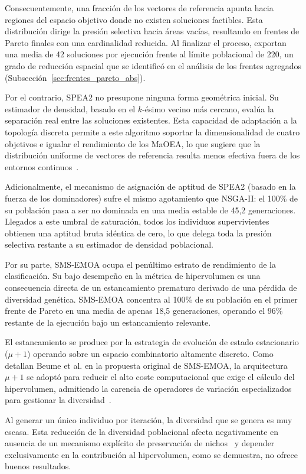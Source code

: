 Consecuentemente, una fracción de los vectores de referencia apunta hacia regiones del espacio objetivo donde no existen soluciones factibles. Esta distribución dirige la presión selectiva hacia áreas vacías, resultando en frentes de Pareto finales con una cardinalidad reducida. Al finalizar el proceso, exportan una media de 42 soluciones por ejecución frente al límite poblacional de 220, un grado de reducción espacial que se identificó en el análisis de los frentes agregados (Subsección~\ref{sec:frentes_pareto_abs}).

Por el contrario, SPEA2 no presupone ninguna forma geométrica inicial. Su estimador de densidad, basado en el $k$-ésimo vecino más cercano, evalúa la separación real entre las soluciones existentes. Esta capacidad de adaptación a la topología discreta permite a este algoritmo soportar la dimensionalidad de cuatro objetivos e igualar el rendimiento de los MaOEA, lo que sugiere que la distribución uniforme de vectores de referencia resulta menos efectiva fuera de los entornos continuos~\cite{ishibuchi2015behavior}.

Adicionalmente, el mecanismo de asignación de aptitud de SPEA2 (basado en la fuerza de los dominadores) sufre el mismo agotamiento que NSGA-II: el 100\% de su población pasa a ser no dominada en una media estable de 45,2 generaciones. Llegados a este umbral de saturación, todos los individuos supervivientes obtienen una aptitud bruta idéntica de cero, lo que delega toda la presión selectiva restante a su estimador de densidad poblacional.

Por su parte, SMS-EMOA ocupa el penúltimo estrato de rendimiento de la clasificación. Su bajo desempeño en la métrica de hipervolumen es una consecuencia directa de un estancamiento prematuro derivado de una pérdida de diversidad genética. SMS-EMOA concentra al 100\% de su población en el primer frente de Pareto en una media de apenas 18,5 generaciones, operando el 96\% restante de la ejecución bajo un estancamiento relevante.

El estancamiento se produce por la estrategia de evolución de estado estacionario ($\mu+1$) operando sobre un espacio combinatorio altamente discreto. Como detallan Beume et al. en la propuesta original de SMS-EMOA, la arquitectura $\mu+1$ se adoptó para reducir el alto coste computacional que exige el cálculo del hipervolumen, admitiendo la carencia de operadores de variación especializados para gestionar la diversidad~\cite{beume2007sms}.

Al generar un único individuo por iteración, la diversidad que se genera es muy escasa. Esta reducción de la diversidad poblacional afecta negativamente en ausencia de un mecanismo explícito de preservación de nichos~\cite{deb2001multi} y depender exclusivamente en la contribución al hipervolumen, como se demuestra, no ofrece buenos resultados.

